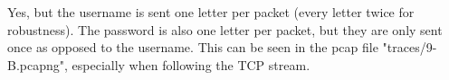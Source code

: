 Yes, but the username is sent one letter per packet (every letter twice for robustness). The password is also one letter per packet, but they are only sent once as opposed to the username. This can be seen in the pcap file "traces/9-B.pcapng", especially when following the TCP stream.